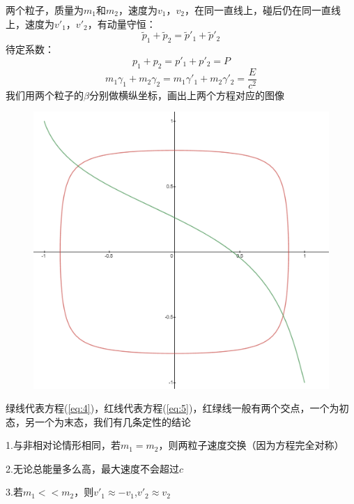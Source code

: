 \documentclass[hyperref,utf8]{ctexart}
\begin{document}
两个粒子，质量为$m_1$和$m_2$，速度为$v_1$，$v_2$，在同一直线上，碰后仍在同一直线上，速度为$v'_1$，$v'_2$，有动量守恒：
\begin{equation}
\tilde{p}_1+\tilde{p}_2=\tilde{p}'_1+\tilde{p}'_2
\end{equation}
待定系数：
\begin{equation}
    p_1+p_2=p'_1+p'_2=P\label{eq:4}
\end{equation}
\begin{equation}
m_1\gamma_1+m_2\gamma_2=m_1\gamma'_1+m_2\gamma'_2=\frac{E}{c^2}\label{eq:5}
\end{equation}
我们用两个粒子的$\beta$分别做横纵坐标，画出上两个方程对应的图像
\begin{figure}[H]
    \centering
    \includegraphics[scale=0.3]{2020-08-27 141243.png}
\end{figure}
绿线代表方程(\ref{eq:4})，红线代表方程(\ref{eq:5})，红绿线一般有两个交点，一个为初态，另一个为末态，我们有几条定性的结论

1.与非相对论情形相同，若$m_1=m_2$，则两粒子速度交换（因为方程完全对称）

2.无论总能量多么高，最大速度不会超过$c$

3.若$m_1<<m_2$，则$v'_1\approx-v_1$,$v'_2\approx v_2$
\end{document}
